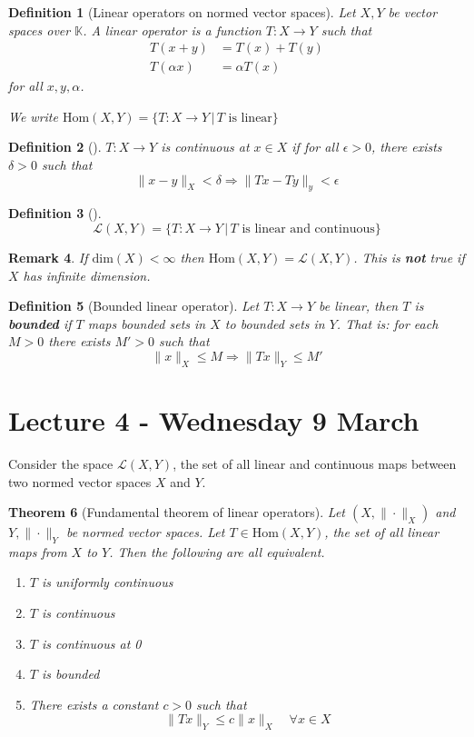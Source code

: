 \documentclass[12pt, oneside, a4paper]{article}
\newtheorem{thm}{Theorem}[section]
\theoremstyle{dfn}
\newtheorem{dfn}[thm]{Definition}
\newtheorem{rem}[thm]{Remark}
\newcommand{\K}{\mathbb{K}}
\begin{document}
\begin{dfn}[Linear operators on normed vector spaces]
    Let $X,Y$ be vector spaces over $\K$.  A linear operator is a function $T:X \rightarrow Y$ such that 
    \begin{align*}
        T(x+y) &= T(x) + T(y) \\
        T(\alpha x) &= \alpha T(x)
    \end{align*}
    for all $x,y,\alpha$.

    We write $\text{Hom}(X,Y) = \{ T: X \rightarrow Y \, | \, \text{$T$ is linear} \}$
\end{dfn}

\begin{dfn}[]
    $T: X \rightarrow Y$ is continuous at $x \in X$ if for all $\epsilon > 0$, there exists $\delta > 0$ such that \[
            \| x - y \|_X < \delta \Rightarrow \| Tx - Ty \|_y < \epsilon 
    \]
\end{dfn}

\begin{dfn}[]
    \[
    \mathcal{L}(X,Y) = \{ T:  X \rightarrow Y \, | \, \text{$T$ is linear and continuous} \}
    \]
\end{dfn}

\begin{rem}
    If $\text{dim}(X) < \infty$ then $\text{Hom}(X,Y) = \mathcal{L}(X,Y)$.  This is \textbf{not} true if $X$ has infinite dimension.
\end{rem}

\begin{dfn}[Bounded linear operator]
    Let $T: X \rightarrow Y$ be linear, then $T$ is \textbf{bounded} if $T$ maps bounded sets in $X$ to bounded sets in $Y$.  That is: for each $M > 0$ there exists $M' > 0$ such that \[
        \| x \|_X \leq M \Rightarrow \|Tx\|_Y \leq M'
    \]
\end{dfn}

\section{Lecture 4 - Wednesday 9 March } %
\label{sec:lecture_4_}
Consider the space $\mathcal{L}(X, Y)$, the set of all linear and continuous maps between two normed vector spaces $X$ and $Y$.  

\begin{thm}[Fundamental theorem of linear operators]
    Let $( X, \| \cdot \|_X)$ and $Y, \| \cdot \|_Y$ be normed vector spaces.  Let $ T \in \text{Hom}(X,Y)$, the set of all linear maps from $X$ to $Y$.  Then the following are all equivalent.
    \begin{enumerate}[1)]
        \item $T$ is uniformly continuous
        \item $T$ is continuous
        \item $T$ is continuous at 0
        \item $T$ is bounded
        \item There exists a constant $c > 0$ such that \[
            \| Tx \|_Y \leq c \| x \|_X \quad \forall x \in X
        \]
    \end{enumerate}
\end{thm}
\end{document}
